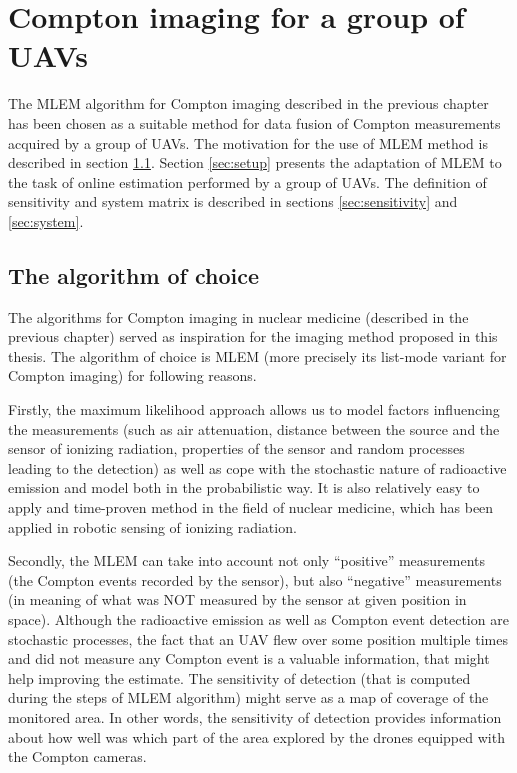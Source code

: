 
\chapter{Compton imaging for a group of UAVs\label{chap:methods_estimation}}
The \ac{MLEM} algorithm for Compton imaging described in the previous chapter has been chosen as a suitable method for data fusion of Compton measurements acquired by a group of \ac{UAV}s.
The motivation for the use of \ac{MLEM} method is described in section \ref{sec:prelim}.
Section \ref{sec:setup} presents the adaptation of \ac{MLEM} to the task of online estimation performed by a group of \ac{UAV}s.
The definition of sensitivity and system matrix is described in sections \ref{sec:sensitivity} and \ref{sec:system}.

\section{The algorithm of choice}
\label{sec:prelim}
The algorithms for Compton imaging in nuclear medicine (described in the previous chapter) served as inspiration for the imaging method proposed in this thesis.
The algorithm of choice is \acf{MLEM} (more precisely its list-mode variant for Compton imaging) for following reasons.

Firstly, the maximum likelihood approach allows us to model factors influencing the measurements (such as air attenuation, distance between the source and the sensor of ionizing radiation,  properties of the sensor and random processes leading to the detection)
as well as cope with the stochastic nature of radioactive emission and model both in the probabilistic way.
It is also relatively easy to apply and time-proven method in the field of nuclear medicine, which has been applied in robotic sensing of ionizing radiation.

Secondly, the \ac{MLEM} can take into account not only ``positive'' measurements (the Compton events recorded by the sensor), but also ``negative'' measurements (in meaning of what was NOT measured by the sensor at given position in space).
Although the radioactive emission as well as Compton event detection are stochastic processes, the fact that an \ac{UAV} flew over some position multiple times and did not measure any Compton event is a valuable information, that might help improving the estimate.
The sensitivity of detection (that is computed during the steps of \ac{MLEM} algorithm) might serve as a map of coverage of the monitored area.
In other words, the sensitivity of detection provides information about how well was which part of the area explored by the drones equipped with the Compton cameras.

